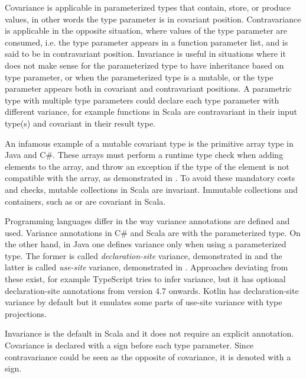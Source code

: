 Covariance is applicable in parameterized types that contain, store, or produce values, in other words the type parameter is in covariant position. Contravariance is applicable in the opposite situation, where values of the type parameter are consumed, i.e. the type parameter appears in a function parameter list, and is said to be in contravariant position. Invariance is useful in situations where it does not make sense for the parameterized type to have inheritance based on type parameter, or when the parameterized type is a mutable, or the type parameter appears both in covariant and contravariant positions. A parametric type with multiple type parameters could declare each type parameter with different variance, for example functions in Scala are contravariant in their input type(s) and covariant in their result type.

An infamous example of a mutable covariant type is the primitive array type in Java and C\#.
These arrays must perform a runtime type check when adding elements to the array, and throw an exception if the type of the element is not compatible with the array, as demonstrated in . To avoid these mandatory costs and checks, mutable collections in Scala are invariant. Immutable collections and containers, such as  or  are covariant in Scala.



Programming languages differ in the way variance annotations are defined and used. Variance annotations in C\# and Scala are with the parameterized type. On the other hand, in Java one defines variance only when using a parameterized type. The former is called \textit{declaration-site} variance, demonstrated in  and the latter is called \textit{use-site} variance, demonstrated in . Approaches deviating from these exist, for example TypeScript tries to infer variance, but it has optional declaration-site annotations from version 4.7 onwards. Kotlin has declaration-site variance by default but it emulates some parts of use-site variance with type projections.





Invariance is the default in Scala and it does not require an explicit annotation. Covariance is declared with a \inlinecode{+} sign before each type parameter. Since contravariance could be seen as the opposite of covariance, it is denoted with a \inlinecode{-} sign.

